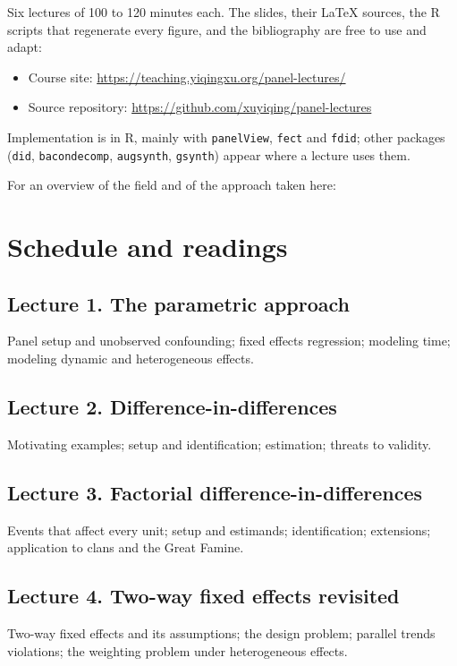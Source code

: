 \documentclass[11pt]{article}
\newcommand{\readings}[1]{%
  \begin{refsection}\nocite{#1}%
  \printbibliography[heading=subbibliography,title={Core readings},category=core]%
  \printbibliography[heading=subbibliography,title={Further readings},notcategory=core]%
  \end{refsection}}
\begin{document}
Six lectures of 100 to 120 minutes each. The slides, their LaTeX sources, the R scripts that regenerate every figure, and the bibliography are free to use and adapt:
\begin{itemize}
\item Course site: \url{https://teaching.yiqingxu.org/panel-lectures/}
\item Source repository: \url{https://github.com/xuyiqing/panel-lectures}
\end{itemize}
Implementation is in R, mainly with \texttt{panelView}, \texttt{fect} and \texttt{fdid}; other packages (\texttt{did}, \texttt{bacondecomp}, \texttt{augsynth}, \texttt{gsynth}) appear where a lecture uses them.

For an overview of the field and of the approach taken here:
\begin{refsection}\nocite{xu2023causal}\printbibliography[heading=none]\end{refsection}

\clearpage
\section*{Schedule and readings}

\subsection*{Lecture 1. The parametric approach}
Panel setup and unobserved confounding; fixed effects regression; modeling time; modeling dynamic and heterogeneous effects.
\readings{stock2007introduction,hainmueller2019direct,holland1986statistics}

\subsection*{Lecture 2. Difference-in-differences}
Motivating examples; setup and identification; estimation; threats to validity.
\readings{card1994minimum,abadie2005semiparametric,roth2023when}

\subsection*{Lecture 3. Factorial difference-in-differences}
Events that affect every unit; setup and estimands; identification; extensions; application to clans and the Great Famine.
\readings{xu2026factorial,cao2022clans,vanderweele2009distinction}

\subsection*{Lecture 4. Two-way fixed effects revisited}
Two-way fixed effects and its assumptions; the design problem; parallel trends violations; the weighting problem under heterogeneous effects.
\readings{imai2021use,goodman2021difference,dechaisemartin2020twoway}
\end{document}

